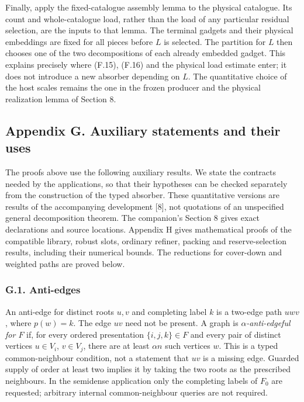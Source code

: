 \documentclass[english,11pt,a4paper]{article}
\begin{document}
Finally, apply the fixed-catalogue assembly lemma to the physical catalogue. Its count and whole-catalogue load, rather than the load of any particular residual selection, are the inputs to that lemma. The terminal gadgets and their physical embeddings are fixed for all pieces before \(L\) is selected. The partition for \(L\) then chooses one of the two decompositions of each already embedded gadget. This explains precisely where (F.15), (F.16) and the physical load estimate enter; it does not introduce a new absorber depending on \(L\). The quantitative choice of the host scales remains the one in the frozen producer and the physical realization lemma of Section 8.

\subsection{Appendix G. Auxiliary statements and their uses}\label{appendix-g.-auxiliary-statements-and-their-uses}

The proofs above use the following auxiliary results. We state the contracts needed by the applications, so that their hypotheses can be checked separately from the construction of the typed absorber. These quantitative versions are results of the accompanying development {[}8{]}, not quotations of an unspecified general decomposition theorem. The companion's Section 8 gives exact declarations and source locations. Appendix H gives mathematical proofs of the compatible library, robust slots, ordinary refiner, packing and reserve-selection results, including their numerical bounds. The reductions for cover-down and weighted paths are proved below.

\subsubsection{G.1. Anti-edges}\label{g.1.-anti-edges}

An anti-edge for distinct roots \(u,v\) and completing label \(k\) is a two-edge path \(uwv\), where \(p(w)=k\). The edge \(uv\) need not be present. A graph is \emph{\(\alpha\)-anti-edgeful for \(F\)} if, for every ordered presentation \(\{i,j,k\}\in F\) and every pair of distinct vertices \(u\in V_i\), \(v\in V_j\), there are at least \(\alpha n\) such vertices \(w\). This is a typed common-neighbour condition, not a statement that \(uv\) is a missing edge. Guarded supply of order at least two implies it by taking the two roots as the prescribed neighbours. In the semidense application only the completing labels of \(F_0\) are requested; arbitrary internal common-neighbour queries are not required.
\end{document}
